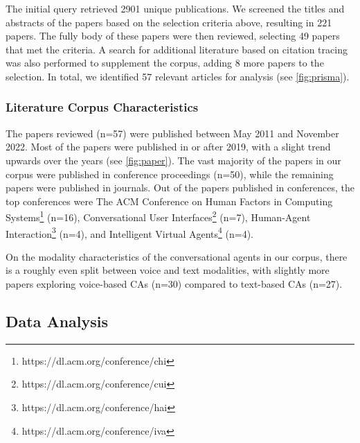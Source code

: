 The initial query retrieved 2901 unique publications. We screened the titles and abstracts of the papers based on the selection criteria above, resulting in 221 papers. The fully body of these papers were then reviewed, selecting 49 papers that met the criteria. A search for additional literature based on citation tracing was also performed to supplement the corpus, adding 8 more papers to the selection. In total, we identified 57 relevant articles for analysis (see \autoref{fig:prisma}).



\subsubsection*{Literature Corpus Characteristics}

The papers reviewed (n=57) were published between May 2011 and November 2022. Most of the papers were published in or after 2019, with a slight trend upwards over the years (see \autoref{fig:paper}). The vast majority of the papers in our corpus were published in conference proceedings (n=50), while the remaining papers were published in journals. Out of the papers published in conferences, the top conferences were The ACM Conference on Human Factors in Computing Systems\footnote{https://dl.acm.org/conference/chi} (n=16), Conversational User Interfaces\footnote{https://dl.acm.org/conference/cui} (n=7), Human-Agent Interaction\footnote{https://dl.acm.org/conference/hai} (n=4), and Intelligent Virtual Agents\footnote{https://dl.acm.org/conference/iva} (n=4). 

On the modality characteristics of the conversational agents in our corpus, there is a roughly even split between voice and text modalities, with slightly more papers exploring voice-based CAs (n=30) compared to text-based CAs (n=27).



\subsection{Data Analysis}

